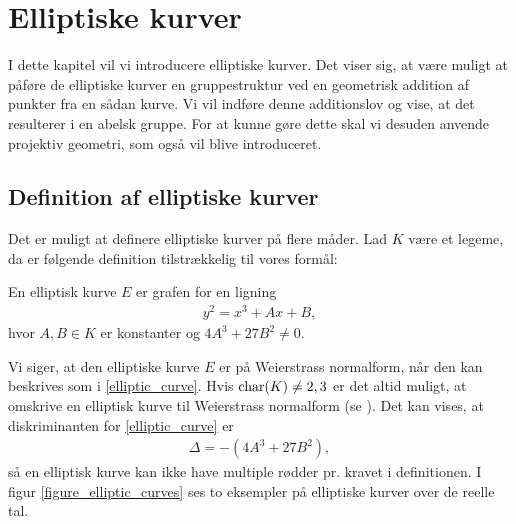 \chapter{Elliptiske kurver}
I dette kapitel vil vi introducere elliptiske kurver.
Det viser sig, at være muligt at påføre de elliptiske kurver en gruppestruktur ved en geometrisk addition af punkter fra en sådan kurve. Vi vil indføre denne additionslov og vise, at det resulterer i en abelsk gruppe. For at kunne gøre dette skal vi desuden anvende projektiv geometri, som også vil blive introduceret.

\section{Definition af elliptiske kurver}
Det er muligt at definere elliptiske kurver på flere måder. Lad $K$ være et legeme, da er følgende definition tilstrækkelig til vores formål:
\begin{definition}
En elliptisk kurve $E$ er grafen for en ligning
\begin{align}
	\label{elliptic_curve}
	y^2 = x^3 + Ax + B,
\end{align}
hvor $A, B \in K$ er konstanter og $4A^3 + 27B^2 \neq 0$. 
\end{definition}
Vi siger, at den elliptiske kurve $E$ er på Weierstrass normalform, når den kan beskrives som i \eqref{elliptic_curve}. Hvis $\text{char} (K) \neq 2, 3$ er det altid muligt, at omskrive en elliptisk kurve til Weierstrass normalform (se \cite[kapitel~2]{Washington}). Det kan vises, at diskriminanten for \eqref{elliptic_curve} er \begin{align*}
	\Delta = -(4A^3 + 27B^2),
\end{align*}
så en elliptisk kurve kan ikke have multiple rødder pr. kravet i definitionen. I figur \ref{figure_elliptic_curves} ses to eksempler på elliptiske kurver over de reelle tal.
